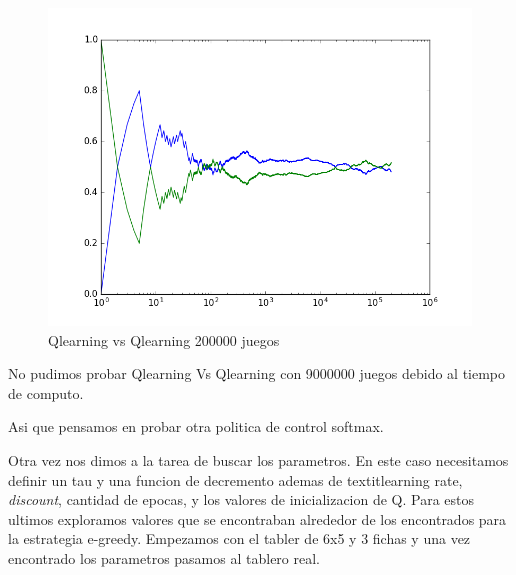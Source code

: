 \begin{figure}[h]
 \centering
 \begin{minipage}{.45\textwidth}
	\centering
	\includegraphics[scale=0.35]{img/QlearningQlearningEgreedy2000007x6(4).png}
       \caption{Qlearning vs Qlearning 200000 juegos}
  \end{minipage}
\end{figure}

No pudimos probar Qlearning Vs Qlearning con 9000000 juegos debido al tiempo de computo.


Asi que pensamos en probar otra politica de control softmax.

Otra vez nos dimos a la tarea de buscar los parametros. En este caso necesitamos definir un tau y una funcion de decremento
 ademas de textit{learning rate}, \textit{discount}, cantidad de epocas, y los valores de inicializacion de Q. Para estos ultimos exploramos valores que se encontraban alrededor de los encontrados para la estrategia e-greedy.
Empezamos con el tabler de 6x5 y 3 fichas y una vez encontrado los parametros pasamos al tablero real.






